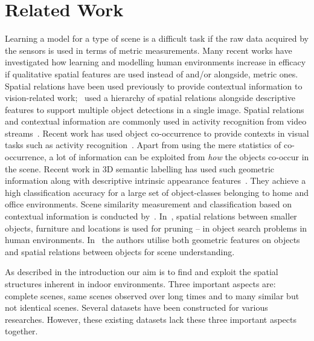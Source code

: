 \documentclass[letterpaper, 10 pt, conference]{ieeeconf}  %
\begin{document}
\section{Related Work}
\label{sec:Related Work}
Learning a model for a type of scene is a difficult task if the raw data
acquired by the sensors is used in terms of metric measurements. Many
recent works have investigated how learning and modelling human
environments increase in efficacy if qualitative spatial features are
used instead of and/or alongside, metric ones. Spatial relations have been used
previously to provide contextual information to vision-related
work;~\cite{MyungJin:CVPR2010} used a hierarchy of spatial relations
alongside descriptive features to support multiple object detections
in a single image. Spatial relations and contextual information are
commonly used in activity recognition from video
streams~\cite{Krishna:ECAI2010, Behera2012}. Recent work has used
object co-occurrence to provide contexts in visual tasks such as
activity recognition~\cite{Li:2012}. Apart from using the mere
statistics of co-occurrence, a lot of information can be exploited
from \textit{how} the objects co-occur in the scene. Recent work in 3D
semantic labelling has used such geometric information along with
descriptive intrinsic appearance
features~\cite{Koppula:NIPS2011}. They achieve a high classification
accuracy for a large set of object-classes belonging to home and
office environments. Scene similarity measurement and classification
based on contextual information is conducted
by~\cite{Fisher:ACMT2011}. In~\cite{Aydemir:ICRA2011}, spatial
relations between smaller objects, furniture and locations is used for
pruning -- in object search problems in human
environments. In~\cite{Southey:2007,kasper:2011} the authors utilise
both geometric features on objects and spatial relations between
objects for scene understanding.

As described in the introduction our aim is to find and exploit the
spatial structures inherent in indoor environments. Three important
aspects are: complete scenes, same scenes observed over long times 
and to many similar but not identical scenes. Several datasets have 
been constructed for various researches. However, these existing 
datasets lack these three important aspects together.
\end{document}
